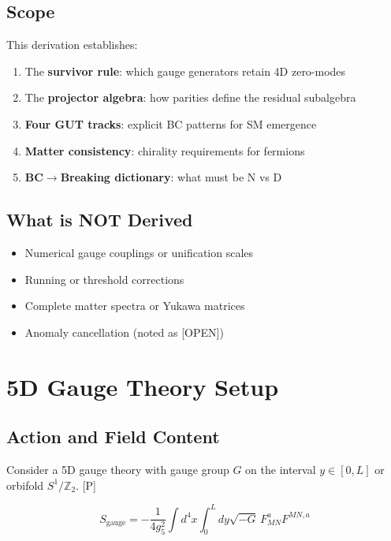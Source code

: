 \documentclass[11pt,a4paper]{article}
\newcommand{\tagP}{\textcolor{green!50!black}{[P]}}
\newcommand{\tagOPEN}{\textcolor{red!70!black}{[OPEN]}}
\begin{document}
\subsection{Scope}
This derivation establishes:
\begin{enumerate}
    \item The \textbf{survivor rule}: which gauge generators retain 4D zero-modes
    \item The \textbf{projector algebra}: how parities define the residual subalgebra
    \item \textbf{Four GUT tracks}: explicit BC patterns for SM emergence
    \item \textbf{Matter consistency}: chirality requirements for fermions
    \item \textbf{BC$\to$Breaking dictionary}: what must be N vs D
\end{enumerate}

\subsection{What is NOT Derived}
\begin{itemize}
    \item Numerical gauge couplings or unification scales
    \item Running or threshold corrections
    \item Complete matter spectra or Yukawa matrices
    \item Anomaly cancellation (noted as \tagOPEN)
\end{itemize}

\section{5D Gauge Theory Setup}

\subsection{Action and Field Content}

Consider a 5D gauge theory with gauge group $G$ on the interval $y \in [0, L]$
or orbifold $S^1/\mathbb{Z}_2$. \tagP

\begin{equation}
\label{eq:5D-action}
S_{\text{gauge}} = -\frac{1}{4g_5^2} \int d^4x \int_0^L dy \sqrt{-G}\,
F_{MN}^a F^{MN,a}
\end{equation}
\end{document}
